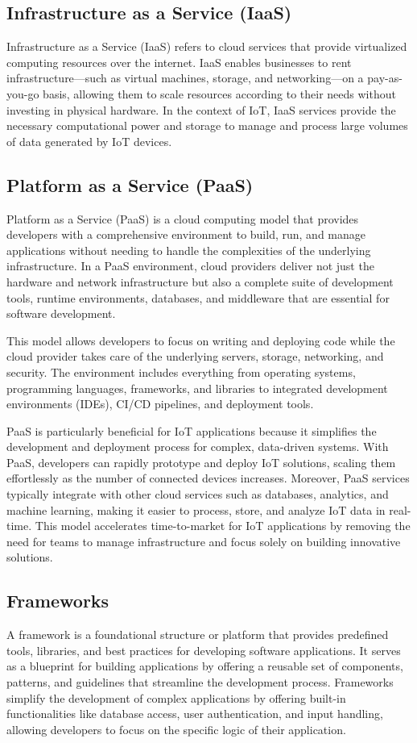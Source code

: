 \subsection*{Infrastructure as a Service (IaaS)}
\label{sec:iaas}
Infrastructure as a Service (IaaS) refers to cloud services that provide virtualized computing resources over the internet. IaaS enables businesses to rent infrastructure—such as virtual machines, storage, and networking—on a pay-as-you-go basis, allowing them to scale resources according to their needs without investing in physical hardware. In the context of IoT, IaaS services provide the necessary computational power and storage to manage and process large volumes of data generated by IoT devices.

\subsection*{Platform as a Service (PaaS)}
\label{sec:paas}
Platform as a Service (PaaS) is a cloud computing model that provides developers with a comprehensive environment to build, run, and manage applications without needing to handle the complexities of the underlying infrastructure. In a PaaS environment, cloud providers deliver not just the hardware and network infrastructure but also a complete suite of development tools, runtime environments, databases, and middleware that are essential for software development.

This model allows developers to focus on writing and deploying code while the cloud provider takes care of the underlying servers, storage, networking, and security. The environment includes everything from operating systems, programming languages, frameworks, and libraries to integrated development environments (IDEs), CI/CD pipelines, and deployment tools.

PaaS is particularly beneficial for IoT applications because it simplifies the development and deployment process for complex, data-driven systems. With PaaS, developers can rapidly prototype and deploy IoT solutions, scaling them effortlessly as the number of connected devices increases. Moreover, PaaS services typically integrate with other cloud services such as databases, analytics, and machine learning, making it easier to process, store, and analyze IoT data in real-time. This model accelerates time-to-market for IoT applications by removing the need for teams to manage infrastructure and focus solely on building innovative solutions.

\subsection*{Frameworks}
\label{sec:frameworks}
A framework is a foundational structure or platform that provides predefined tools, libraries, and best practices for developing software applications. It serves as a blueprint for building applications by offering a reusable set of components, patterns, and guidelines that streamline the development process. Frameworks simplify the development of complex applications by offering built-in functionalities like database access, user authentication, and input handling, allowing developers to focus on the specific logic of their application.

